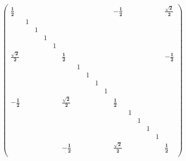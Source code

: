\documentclass[12pt]{article}
\begin{document}
\begin{equation}
\begin{pmatrix}
\pmb{\frac{1}{2}} &   &   &   &   &   &   &   &   &   & \pmb{-\frac{1}{2}} &   &   &   &   & \pmb{\frac{\sqrt{2}}{2}} \\
  & 1 &   &   &   &   &   &   &   &   &   &   &   &   &   &   \\
  &   & 1 &   &   &   &   &   &   &   &   &   &   &   &   &   \\
  &   &   & 1 &   &   &   &   &   &   &   &   &   &   &   &   \\
  &   &   &   & 1 &   &   &   &   &   &   &   &   &   &   &   \\
\pmb{\frac{\sqrt{2}}{2}} &   &   &   &   & \pmb{\frac{1}{2}} &   &   &   &   &   &   &   &   &   & \pmb{-\frac{1}{2}} \\
  &   &   &   &   &   & 1 &   &   &   &   &   &   &   &   &   \\
  &   &   &   &   &   &   & 1 &   &   &   &   &   &   &   &   \\
  &   &   &   &   &   &   &   & 1 &   &   &   &   &   &   &   \\
  &   &   &   &   &   &   &   &   & 1 &   &   &   &   &   &   \\
\pmb{-\frac{1}{2}} &   &   &   &   & \pmb{\frac{\sqrt{2}}{2}} &   &   &   &   & \pmb{\frac{1}{2}} &   &   &   &   &   \\
  &   &   &   &   &   &   &   &   &   &   & 1 &   &   &   &   \\
  &   &   &   &   &   &   &   &   &   &   &   & 1 &   &   &   \\
  &   &   &   &   &   &   &   &   &   &   &   &   & 1 &   &   \\
  &   &   &   &   &   &   &   &   &   &   &   &   &   & 1 &   \\
  &   &   &   &   & \pmb{-\frac{1}{2}} &   &   &   &   & \pmb{\frac{\sqrt{2}}{2}} &   &   &   &   & \pmb{\frac{1}{2}} \\
\end{pmatrix}
\end{equation}
\end{document}
